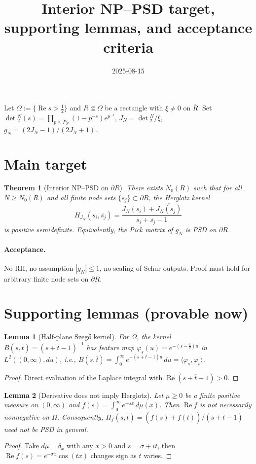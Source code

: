 \documentclass[11pt]{article}
\title{Interior NP--PSD target, supporting lemmas, and acceptance criteria}
\date{2025-08-15}
\newtheorem{theorem}{Theorem}
\newtheorem{lemma}{Lemma}
\theoremstyle{remark}
\newcommand{\ReS}{\operatorname{Re}}
\begin{document}
\maketitle

Let $\Omega:=\{\ReS s>\tfrac12\}$ and $R\Subset\Omega$ be a rectangle with $\xi\ne0$ on $\overline R$. Set $\det{}_2^N(s)=\prod_{p\le P_N}(1-p^{-s})e^{p^{-s}}$, $J_N=\det{}_2^N/\xi$, $g_N=(2J_N-1)/(2J_N+1)$.

\section*{Main target}
\begin{theorem}[Interior NP--PSD on $\partial R$]\label{thm:np_psd}
There exists $N_0(R)$ such that for all $N\ge N_0(R)$ and all finite node sets $\{s_j\}\subset \partial R$, the Herglotz kernel
\[H_{J_N}(s_i,\overline{s_j})=\frac{J_N(s_i)+\overline{J_N(s_j)}}{s_i+\overline{s_j}-1}\]
is positive semidefinite. Equivalently, the Pick matrix of $g_N$ is PSD on $\partial R$.
\end{theorem}

\paragraph{Acceptance.} No RH, no assumption $|g_N|\le1$, no scaling of Schur outputs. Proof must hold for arbitrary finite node sets on $\partial R$.

\section*{Supporting lemmas (provable now)}

\begin{lemma}[Half-plane Szeg\H{o} kernel]\label{lem:szego}
For $\Omega$, the kernel $B(s,\overline t)=(s+\overline t-1)^{-1}$ has feature map $\varphi_s(u)=e^{-(s-\tfrac12)u}$ in $L^2((0,\infty),du)$, i.e., $B(s,\overline t)=\int_0^\infty e^{-(s+\overline t-1)u}\,du=\langle\varphi_s,\varphi_t\rangle$.
\end{lemma}
\begin{proof}
Direct evaluation of the Laplace integral with $\ReS(s+\overline t-1)>0$.
\end{proof}

\begin{lemma}[Derivative does not imply Herglotz]\label{lem:not_herglotz}
Let $\mu\ge0$ be a finite positive measure on $(0,\infty)$ and $f(s)=\int_0^\infty e^{-sx}\,d\mu(x)$. Then $\ReS f$ is not necessarily nonnegative on $\Omega$. Consequently, $H_f(s,\overline t)=(f(s)+\overline{f(t)})/(s+\overline t-1)$ need not be PSD in general.
\end{lemma}
\begin{proof}
Take $d\mu=\delta_x$ with any $x>0$ and $s=\sigma+it$, then $\ReS f(s)=e^{-\sigma x}\cos(tx)$ changes sign as $t$ varies.
\end{proof}
\end{document}
